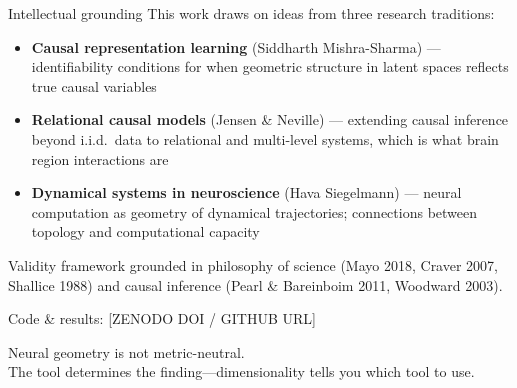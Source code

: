 \documentclass[aspectratio=169,11pt]{beamer}
\begin{document}
\begin{frame}{Intellectual grounding}
This work draws on ideas from three research traditions:

\vspace{0.5em}
\begin{itemize}
  \item \textbf{Causal representation learning} (Siddharth Mishra-Sharma) --- identifiability conditions for when geometric structure in latent spaces reflects true causal variables
  \item \textbf{Relational causal models} (Jensen \& Neville) --- extending causal inference beyond i.i.d.\ data to relational and multi-level systems, which is what brain region interactions are
  \item \textbf{Dynamical systems in neuroscience} (Hava Siegelmann) --- neural computation as geometry of dynamical trajectories; connections between topology and computational capacity
\end{itemize}

\vspace{0.5em}
Validity framework grounded in philosophy of science (Mayo 2018, Craver 2007, Shallice 1988) and causal inference (Pearl \& Bareinboim 2011, Woodward 2003).
\end{frame}


\begin{frame}[standout]
  Code \& results: {\small [ZENODO DOI / GITHUB URL]}

  \vspace{1em}
  Neural geometry is not metric-neutral.\\
  The tool determines the finding---dimensionality tells you which tool to use.
\end{frame}
\end{document}

